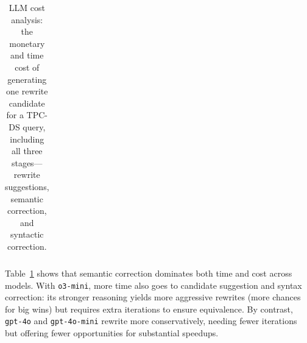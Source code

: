 \begin{table}[h]
\begin{tabular}{  c | r r r | r r r }
\bottomrule
\end{tabular}
\captionsetup{font=small,name=Table}
\caption{\small LLM cost analysis: the monetary and time cost of generating one rewrite candidate for a TPC-DS query, including all three stages--- rewrite suggestions, semantic correction, and syntactic correction.}
\inv
\label{gen:tab:llm_cost}
\vspace{-10pt}
\end{table}

 

 Table~\ref{gen:tab:llm_cost} shows that semantic correction dominates both time and cost across models. With \texttt{o3-mini}, more time also goes to candidate suggestion and syntax correction: its stronger reasoning yields more aggressive rewrites (more chances for big wins) but requires extra iterations to ensure equivalence. By contrast, \texttt{gpt-4o} and \texttt{gpt-4o-mini} rewrite more conservatively, needing fewer iterations but offering fewer opportunities for substantial speedups.


